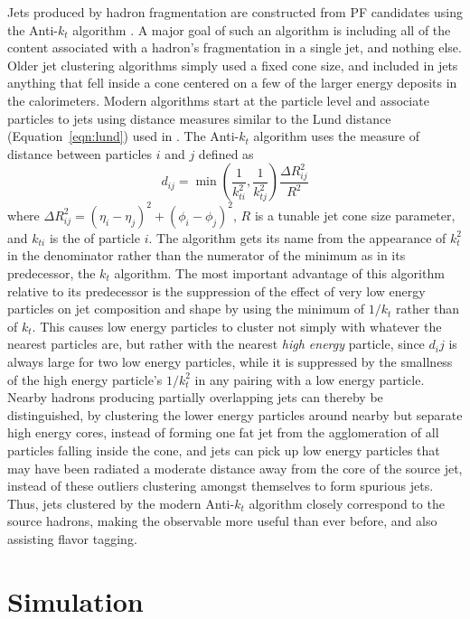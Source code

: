   Jets produced by hadron fragmentation are constructed from PF candidates using the Anti-$k_t$ algorithm \cite{antikt}.
  A major goal of such an algorithm is including all of the content associated with a hadron's fragmentation in a single jet, and nothing else.
  Older jet clustering algorithms simply used a fixed cone size, and included in jets anything that fell inside a cone centered on a few of the larger energy deposits in the calorimeters.
  Modern algorithms start at the particle level and associate particles to jets using distance measures similar to the Lund distance (Equation~\ref{eqn:lund}) used in \mttwo.
  The Anti-$k_t$ algorithm uses the measure of distance between particles $i$ and $j$ defined as
  \begin{equation} \label{eqn:antikt}
    d_{ij} = \min\left(\frac{1}{k_{ti}^2},\frac{1}{k_{tj}^2}\right)\frac{\Delta R_{ij}^2}{R^2}
  \end{equation}
  where $\Delta R_{ij}^2=(\eta_i-\eta_j)^2 + (\phi_i-\phi_j)^2$, $R$ is a tunable jet cone size parameter, and $k_{ti}$ is the \pt of particle $i$.
  The algorithm gets its name from the appearance of $k_t^2$ in the denominator rather than the numerator of the minimum as in its predecessor, the $k_t$ algorithm.
  The most important advantage of this algorithm relative to its predecessor is the suppression of the effect of very low energy particles on jet composition and shape by using the minimum of $1/k_t$ rather than of $k_t$.
  This causes low energy particles to cluster not simply with whatever the nearest particles are, but rather with the nearest {\it high energy} particle, since $d_ij$ is always large for two low energy particles, while it is suppressed by the smallness of the high energy particle's $1/k_t^2$ in any pairing with a low energy particle.
  Nearby hadrons producing partially overlapping jets can thereby be distinguished, by clustering the lower energy particles around nearby but separate high energy cores, instead of forming one fat jet from the agglomeration of all particles falling inside the cone, and jets can pick up low energy particles that may have been radiated a moderate distance away from the core of the source jet, instead of these outliers clustering amongst themselves to form spurious jets.
  Thus, jets clustered by the modern Anti-$k_t$ algorithm closely correspond to the source hadrons, making the \njet observable more useful than ever before, and also assisting flavor tagging.

\section{Simulation} \label{sec:simulation}

